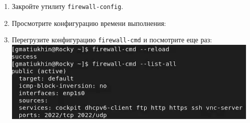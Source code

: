 \documentclass[12pt]{article}
\begin{document}
\begin{enumerate}
	\item Закройте утилиту \texttt{firewall-config}.
	\item Просмотрите конфигурацию времени выполнения:
	\item Перегрузите конфигурацию \texttt{firewall-cmd} и посмотрите еще раз:
	      \\\includegraphics{14.png}
\end{enumerate}
\end{document}
